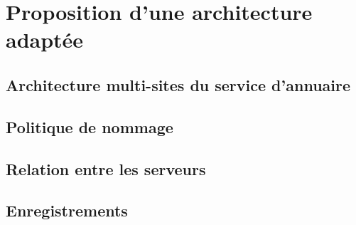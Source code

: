 \section{Proposition d'une architecture adaptée}

\subsection{Architecture multi-sites du service d'annuaire}

\subsection{Politique de nommage}

\subsection{Relation entre les serveurs}

\subsection{Enregistrements}
